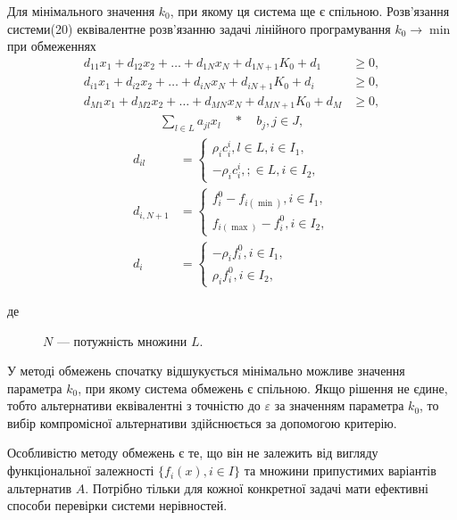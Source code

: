 Для мінімального значення $k_0$, при якому ця система ще є спільною. 
Розв'язання системи(20) еквівалентне розв'язанню задачі лінійного програмування $k_0 \to \min$ при обмеженнях 
\begin{align*}
	d_{11} x_1 	+ d_{12} x_2 + \ldots + d_{1N} x_N + d_{1 N+1} K_0 + d_1 &\geq 0, \\
	d_{i1} x_1 	+ d_{i2} x_2 + \ldots + d_{iN} x_N + d_{i N+1} K_0 + d_i &\geq 0, \\
	d_{M1} x_1 	+ d_{M2} x_2 + \ldots + d_{MN} x_N + d_{M N+1} K_0 + d_M &\geq 0,
\end{align*}
\begin{gather*}
	\sum_{l \in L}{a_{jl} x_l \quad * \quad b_j}, j \in J,
\end{gather*}
\begin{align*}
	d_{il} &= 
	\begin{cases}
		\rho_i c_{i}^i, l \in L, i \in I_1, \\
		-\rho_i c_{i}^i, ; \in L, i \in I_2, 
	\end{cases} \\
	d_{i, N+1} &= 
	\begin{cases}
		f_{i}^0 - f_{i(\min)}, i \in I_1, \\
		f_{i(\max)} - f_{i}^0 , i \in I_2,
	\end{cases} \\
	d_{i} &= 
	\begin{cases}
		- \rho_i f_{i}^0, i \in I_1, \\
		\rho_i f_{i}^0, i \in I_2, 
	\end{cases}
\end{align*}
\begin{description}
\item[де] $N$ --- потужність множини $L$.
\end{description}

У методі обмежень спочатку відшукується мінімально можливе значення параметра $k_0$, при якому система обмежень є спільною. 
Якщо рішення не єдине, тобто альтернативи еквівалентні з точністю до $\varepsilon$ за значенням параметра $k_0$, то вибір компромісної альтернативи здійснюється за допомогою критерію.

Особливістю методу обмежень є те, що він не залежить від вигляду функціональної залежності $\{ f_i(x), i \in I \}$ та множини припустимих варіантів альтернатив $A$.
Потрібно тільки для кожної конкретної задачі мати ефективні способи перевірки системи нерівностей.  


